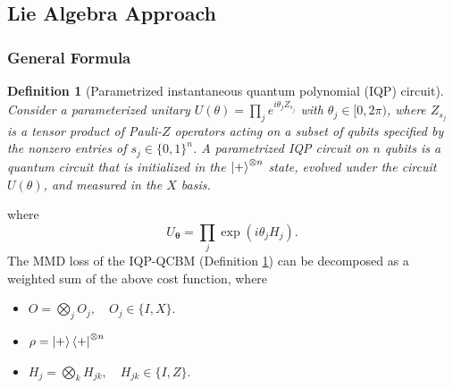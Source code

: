 \documentclass[a4paper,onecolumn,notitlepage,nofootinbib,longbibliography,superscriptaddress, floatfix, pra, aps, 10pt]{revtex4-2}
\newcommand{\vttheta}{{\bm{\theta}}}
\newtheorem{definition}{Definition}
\begin{document}
\subsection{Lie Algebra Approach}
\subsubsection{General Formula}
\begin{definition}[Parametrized instantaneous quantum polynomial (IQP) circuit]
\label{def: IQP}
Consider a parameterized unitary $U(\theta) = \prod_j e^{i\theta_j Z_{s_j}}$ with $\theta_j\in[0, 2\pi)$, where $Z_{s_j}$ is a tensor product of Pauli-$Z$ operators acting on a subset of qubits specified by the nonzero entries of $s_j \in \{0,1\}^n$. A parametrized IQP circuit on $n$ qubits is a quantum circuit that is initialized in the $\ket{+}^{\otimes n}$ state, evolved under the circuit $U(\theta)$, and measured in the $X$ basis.
\end{definition}

where \begin{equation}
    U_\vttheta = \prod_{j}\exp(i\theta_j H_j).
\end{equation} The MMD loss of the IQP-QCBM (Definition \ref{def: IQP}) can be decomposed as a weighted sum of the above cost function, where \begin{itemize}
    \item $O=\bigotimes_j O_j, \quad O_j \in \{I,X\}$.
    \item $\rho = \ket{+}\bra{+}^{\otimes n}$
    \item $H_j =\bigotimes_k H_{jk}, \quad H_{jk} \in \{I,Z\}$. 
\end{itemize}
\end{document}
